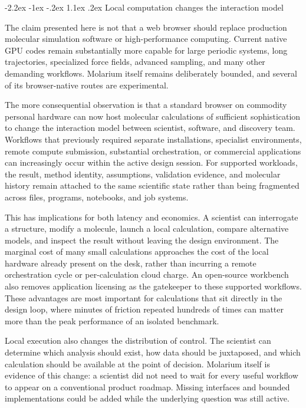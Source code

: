 \documentclass[11pt]{article}
\makeatletter
\renewcommand\section{\@startsection{section}{1}{\z@}%
  {-2.2ex \@plus -1ex \@minus -.2ex}%
  {1.1ex \@plus .2ex}%
  {\normalfont\Large\bfseries\color{molblue}}}
\makeatother
\begin{document}
\section{Local computation changes the interaction model}

The claim presented here is not that a web browser should replace production molecular simulation software or high-performance computing. Current native GPU codes remain substantially more capable for large periodic systems, long trajectories, specialized force fields, advanced sampling, and many other demanding workflows. Molarium itself remains deliberately bounded, and several of its browser-native routes are experimental.

The more consequential observation is that a standard browser on commodity personal hardware can now host molecular calculations of sufficient sophistication to change the interaction model between scientist, software, and discovery team. Workflows that previously required separate installations, specialist environments, remote compute submission, substantial orchestration, or commercial applications can increasingly occur within the active design session. For supported workloads, the result, method identity, assumptions, validation evidence, and molecular history remain attached to the same scientific state rather than being fragmented across files, programs, notebooks, and job systems.

This has implications for both latency and economics. A scientist can interrogate a structure, modify a molecule, launch a local calculation, compare alternative models, and inspect the result without leaving the design environment. The marginal cost of many small calculations approaches the cost of the local hardware already present on the desk, rather than incurring a remote orchestration cycle or per-calculation cloud charge. An open-source workbench also removes application licensing as the gatekeeper to these supported workflows. These advantages are most important for calculations that sit directly in the design loop, where minutes of friction repeated hundreds of times can matter more than the peak performance of an isolated benchmark.

Local execution also changes the distribution of control. The scientist can determine which analysis should exist, how data should be juxtaposed, and which calculation should be available at the point of decision. Molarium itself is evidence of this change: a scientist did not need to wait for every useful workflow to appear on a conventional product roadmap. Missing interfaces and bounded implementations could be added while the underlying question was still active.
\end{document}
